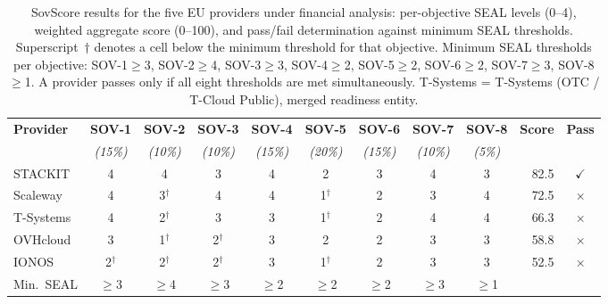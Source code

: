 \begin{table}[htbp]
\centering
\footnotesize
\setlength\tabcolsep{4pt}
\caption{SovScore results for the five EU providers under financial analysis: per-objective SEAL levels (0--4), weighted aggregate score (0--100), and pass/fail determination against minimum SEAL thresholds. Superscript~$\dagger$ denotes a cell below the minimum threshold for that objective. Minimum SEAL thresholds per objective: SOV-1$\geq$3, SOV-2$\geq$4, SOV-3$\geq$3, SOV-4$\geq$2, SOV-5$\geq$2, SOV-6$\geq$2, SOV-7$\geq$3, SOV-8$\geq$1. A provider passes only if all eight thresholds are met simultaneously. T-Systems = T-Systems (OTC / T-Cloud Public), merged readiness entity.}
\label{tab:sovscore_results}
\begin{tabular}{lccccccccrc}
\toprule
\textbf{Provider} &
  \textbf{SOV-1} & \textbf{SOV-2} & \textbf{SOV-3} &
  \textbf{SOV-4} & \textbf{SOV-5} & \textbf{SOV-6} &
  \textbf{SOV-7} & \textbf{SOV-8} &
  \textbf{Score} & \textbf{Pass} \\
& \textit{\scriptsize(15\%)} & \textit{\scriptsize(10\%)} & \textit{\scriptsize(10\%)} & \textit{\scriptsize(15\%)} & \textit{\scriptsize(20\%)} & \textit{\scriptsize(15\%)} & \textit{\scriptsize(10\%)} & \textit{\scriptsize(5\%)} & & \\
\midrule
STACKIT &
  \cellcolor{green!35}4 & \cellcolor{green!35}4 & \cellcolor{green!15}3 & \cellcolor{green!35}4 &
  \cellcolor{yellow!40}2 & \cellcolor{green!15}3 & \cellcolor{green!35}4 & \cellcolor{green!15}3 &
  82.5 & \textcolor{green!50!black}{$\checkmark$} \\
Scaleway &
  \cellcolor{green!35}4 & \cellcolor{green!15}3$^{\dagger}$ & \cellcolor{green!35}4 & \cellcolor{green!35}4 &
  \cellcolor{orange!35}1$^{\dagger}$ & \cellcolor{yellow!40}2 & \cellcolor{green!15}3 & \cellcolor{green!35}4 &
  72.5 & \textcolor{red!60!black}{$\times$} \\
T-Systems &
  \cellcolor{green!35}4 & \cellcolor{yellow!40}2$^{\dagger}$ & \cellcolor{green!15}3 & \cellcolor{green!15}3 &
  \cellcolor{orange!35}1$^{\dagger}$ & \cellcolor{yellow!40}2 & \cellcolor{green!35}4 & \cellcolor{green!35}4 &
  66.3 & \textcolor{red!60!black}{$\times$} \\
OVHcloud &
  \cellcolor{green!15}3 & \cellcolor{orange!35}1$^{\dagger}$ & \cellcolor{yellow!40}2$^{\dagger}$ & \cellcolor{green!15}3 &
  \cellcolor{yellow!40}2 & \cellcolor{yellow!40}2 & \cellcolor{green!15}3 & \cellcolor{green!15}3 &
  58.8 & \textcolor{red!60!black}{$\times$} \\
IONOS &
  \cellcolor{yellow!40}2$^{\dagger}$ & \cellcolor{yellow!40}2$^{\dagger}$ & \cellcolor{yellow!40}2$^{\dagger}$ & \cellcolor{green!15}3 &
  \cellcolor{orange!35}1$^{\dagger}$ & \cellcolor{yellow!40}2 & \cellcolor{green!15}3 & \cellcolor{green!15}3 &
  52.5 & \textcolor{red!60!black}{$\times$} \\
\midrule
\footnotesize Min.\ SEAL &
  \footnotesize$\geq$3 & \footnotesize$\geq$4 & \footnotesize$\geq$3 & \footnotesize$\geq$2 &
  \footnotesize$\geq$2 & \footnotesize$\geq$2 & \footnotesize$\geq$3 & \footnotesize$\geq$1 & & \\
\bottomrule
\end{tabular}
\end{table}

